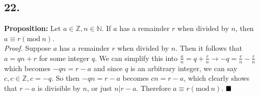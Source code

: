 \documentclass[12pt]{article}
\begin{document}
\hfill\vline\hfill
\begin{minipage}[t]{0.45\textwidth}
	
\subsection*{22.}
\textbf{Proposition:} Let $ a\in \mathbb{Z}, n\in \mathbb{N} $. If $ a $ has a remainder $ r $ when divided by $ n $, then $ a\equiv r(\mathrm{mod}\ n) $.
\\\textit{Proof.} Suppose $ a $ has a remainder $ r $ when divided by $ n $. Then it follows that $ a=qn+r $ for some integer $ q $.  We can simplify this into $ \frac{a}{n}=q+\frac{r}{n}\rightarrow -q=\frac{r}{n}-\frac{r}{n}$ which becomes $ -qn=r-a $ and since $ q $ is an arbitrary integer, we can say $ c,c\in \mathbb{Z}, c=-q $. So then $ -qn=r-a $ becomes $ cn=r-a $, which clearly shows that $ r-a $ is divisible by $ n $, or just $ n|r-a $. Therefore $ a\equiv r(\mathrm{mod}\ n) $.
$ \hfill\blacksquare $ 

\end{minipage}
\pagebreak


\end{document}
